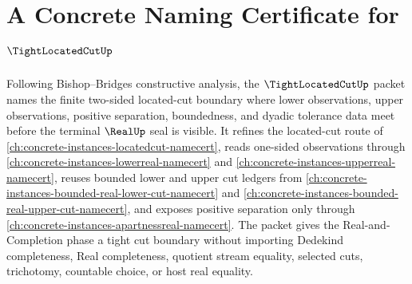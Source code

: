 \chapter{A Concrete Naming Certificate for $\TightLocatedCutUp$}
\label{ch:concrete-instances-tight-located-cut-namecert}

Following Bishop--Bridges constructive analysis, the $\TightLocatedCutUp$ packet names the finite two-sided located-cut boundary where lower observations, upper observations, positive separation, boundedness, and dyadic tolerance data meet before the terminal $\RealUp$ seal is visible. It refines the located-cut route of \autoref{ch:concrete-instances-locatedcut-namecert}, reads one-sided observations through \autoref{ch:concrete-instances-lowerreal-namecert} and \autoref{ch:concrete-instances-upperreal-namecert}, reuses bounded lower and upper cut ledgers from \autoref{ch:concrete-instances-bounded-real-lower-cut-namecert} and \autoref{ch:concrete-instances-bounded-real-upper-cut-namecert}, and exposes positive separation only through \autoref{ch:concrete-instances-apartnessreal-namecert}. The packet gives the Real-and-Completion phase a tight cut boundary without importing Dedekind completeness, Real completeness, quotient stream equality, selected cuts, trichotomy, countable choice, or host real equality.

